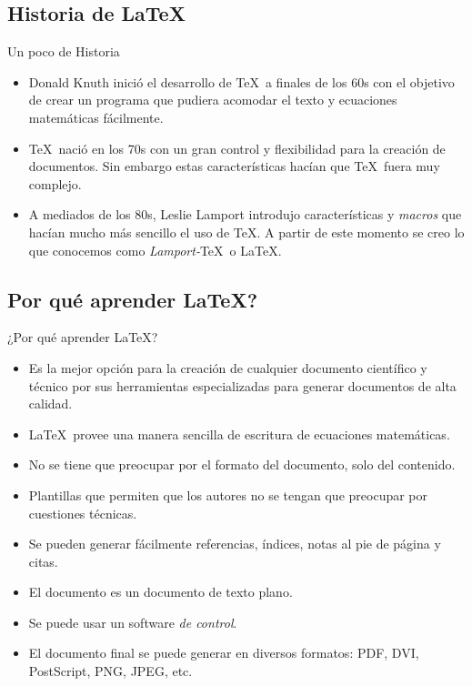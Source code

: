 \documentclass[11pt]{beamer}
\begin{document}
	\subsection{Historia de \LaTeX}
		\begin{frame}{Un poco de Historia}
			
			\begin{itemize}
			\justifying
			\item Donald Knuth inició el desarrollo de \TeX\ a finales de los 60s con el objetivo de 
			crear un programa que pudiera acomodar el texto y ecuaciones matemáticas 
			fácilmente. 
			\item \TeX\ nació en los 70s con un gran control y flexibilidad para la creación 
			de documentos. Sin embargo estas características hacían que \TeX\ fuera muy 
			complejo.
			\item A mediados de los 80s, Leslie Lamport introdujo características y \textit{macros} que hacían 
			mucho más sencillo el uso de \TeX. A partir de este momento se creo lo que conocemos como 
			\textit{Lamport-}\TeX\ o \LaTeX.
			\end{itemize}
	
		\end{frame}

	\subsection{Por qu\'e aprender \LaTeX?}	

		\begin{frame}{¿Por qu\'e aprender \LaTeX?}
			\begin{itemize}
				\item Es la mejor opción para la creación de cualquier documento 
				científico y técnico por sus herramientas especializadas para 
				generar documentos de alta calidad.
				\item \LaTeX\ provee una manera sencilla de escritura de ecuaciones matemáticas.
				\item No se tiene que preocupar por el formato del documento, solo del contenido.
				\item Plantillas que permiten que los autores no se tengan que preocupar por 
				cuestiones técnicas.
				\item Se pueden generar fácilmente referencias, índices, notas al pie de página y 
				citas.
				\item El documento es un documento de texto plano. 
				\item Se puede usar un software \textit{de control}.
				\item El documento final se puede generar en diversos formatos: PDF, DVI, PostScript, PNG, JPEG, etc.			\end{itemize}
		\end{frame}
\end{document}
